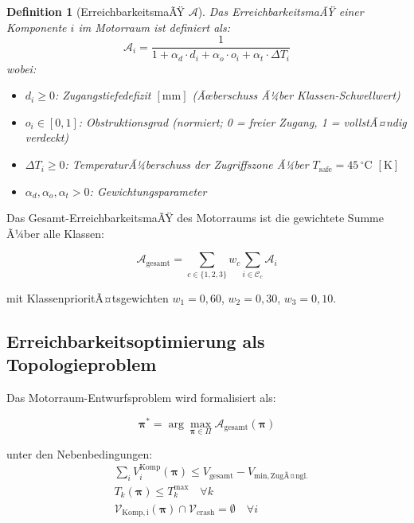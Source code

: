 ﻿\documentclass[12pt,a4paper]{article}
\newtheorem{definition}{Definition}[section]
\begin{document}
\begin{definition}[ErreichbarkeitsmaÃŸ $\mathcal{A}$]
	\label{def:erreichbarkeit}
	Das ErreichbarkeitsmaÃŸ einer Komponente $i$ im Motorraum ist definiert als:
	\begin{equation}
		\mathcal{A}_i = \frac{1}{1 + \alpha_d \cdot d_i + \alpha_o \cdot o_i
			+ \alpha_t \cdot \Delta T_i}
		\label{eq:erreichbarkeit_i}
	\end{equation}
	wobei:
	\begin{itemize}[leftmargin=*]
		\item $d_i \geq 0$: Zugangstiefedefizit $[\mathrm{mm}]$ (Ãœberschuss Ã¼ber
		Klassen-Schwellwert)
		\item $o_i \in [0,1]$: Obstruktionsgrad (normiert; 0 = freier Zugang,
		1 = vollstÃ¤ndig verdeckt)
		\item $\Delta T_i \geq 0$: TemperaturÃ¼berschuss der Zugriffszone Ã¼ber
		$T_\mathrm{safe} = 45\,^\circ\mathrm{C}$ $[\mathrm{K}]$
		\item $\alpha_d, \alpha_o, \alpha_t > 0$: Gewichtungsparameter
	\end{itemize}
\end{definition}

Das Gesamt-ErreichbarkeitsmaÃŸ des Motorraums ist die gewichtete Summe Ã¼ber
alle Klassen:

\begin{equation}
	\mathcal{A}_\mathrm{gesamt} = \sum_{c \in \{1,2,3\}} w_c
	\sum_{i \in \mathcal{C}_c} \mathcal{A}_i
	\label{eq:erreichbarkeit_gesamt}
\end{equation}

mit KlassenprioritÃ¤tsgewichten $w_1 = 0{,}60$, $w_2 = 0{,}30$, $w_3 = 0{,}10$.

\subsection{Erreichbarkeitsoptimierung als Topologieproblem}

Das Motorraum-Entwurfsproblem wird formalisiert als:

\begin{equation}
	\boldsymbol{\pi}^* = \arg\max_{\boldsymbol{\pi} \in \Pi}
	\mathcal{A}_\mathrm{gesamt}(\boldsymbol{\pi})
	\label{eq:opt_problem}
\end{equation}

unter den Nebenbedingungen:
\begin{align}
	&\sum_{i} V_i^\mathrm{Komp}(\boldsymbol{\pi}) \leq V_\mathrm{gesamt} - V_\mathrm{min,ZugÃ¤ngl.}
	\label{eq:vol_constraint} \\
	&T_k(\boldsymbol{\pi}) \leq T_k^\mathrm{max} \quad \forall k
	\label{eq:temp_constraint} \\
	&\mathcal{V}_\mathrm{Komp,i}(\boldsymbol{\pi}) \cap \mathcal{V}_\mathrm{crash} = \emptyset
	\quad \forall i
	\label{eq:crash_constraint2}
\end{align}
\end{document}
